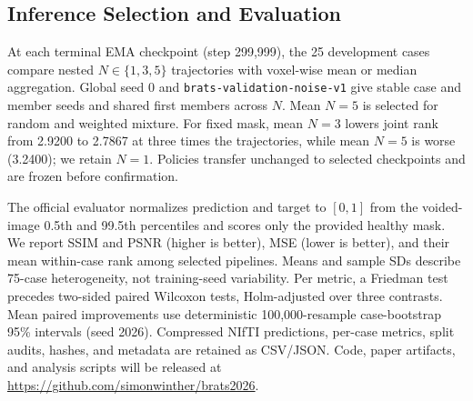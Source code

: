 \subsection{Inference Selection and Evaluation}
\label{sec:exp:selection}

At each terminal EMA checkpoint (step 299,999), the 25 development cases compare
nested $N\in\{1,3,5\}$ trajectories with voxel-wise mean or median aggregation.
Global seed 0 and \texttt{brats-validation-noise-v1} give stable case and member seeds
and shared first members across $N$. Mean $N=5$ is selected for random and weighted
mixture. For fixed mask, mean $N=3$ lowers joint rank from 2.9200 to 2.7867 at
three times the trajectories, while mean $N=5$ is worse (3.2400); we retain $N=1$.
Policies transfer unchanged to selected checkpoints and are frozen before
confirmation.

The official evaluator normalizes prediction and target to $[0,1]$ from the
voided-image 0.5th and 99.5th percentiles and scores only the provided healthy mask.
We report SSIM and PSNR (higher is better), MSE (lower is better), and their mean
within-case rank among selected pipelines. Means and sample SDs describe 75-case
heterogeneity, not training-seed variability. Per metric, a Friedman test precedes
two-sided paired Wilcoxon tests, Holm-adjusted over three contrasts. Mean paired
improvements use deterministic 100,000-resample case-bootstrap 95\% intervals
(seed 2026). Compressed NIfTI predictions, per-case metrics, split audits, hashes,
and metadata are retained as CSV/JSON. Code, paper artifacts, and analysis scripts
will be released at
\url{https://github.com/simonwinther/brats2026}.
